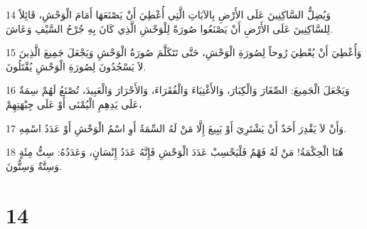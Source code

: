 \par 14 وَيُضِلُّ السَّاكِنِينَ عَلَى الأَرْضِ بِالآيَاتِ الَّتِي أُعْطِيَ أَنْ يَصْنَعَهَا أَمَامَ الْوَحْشِ، قَائِلاً لِلسَّاكِنِينَ عَلَى الأَرْضِ أَنْ يَصْنَعُوا صُورَةً لِلْوَحْشِ الَّذِي كَانَ بِهِ جُرْحُ السَّيْفِ وَعَاشَ.
\par 15 وَأُعْطِيَ أَنْ يُعْطِيَ رُوحاً لِصُورَةِ الْوَحْشِ، حَتَّى تَتَكَلَّمَ صُورَةُ الْوَحْشِ وَيَجْعَلَ جَمِيعَ الَّذِينَ لاَ يَسْجُدُونَ لِصُورَةِ الْوَحْشِ يُقْتَلُونَ.
\par 16 وَيَجْعَلَ الْجَمِيعَ: الصِّغَارَ وَالْكِبَارَ، وَالأَغْنِيَاءَ وَالْفُقَرَاءَ، وَالأَحْرَارَ وَالْعَبِيدَ، تُصْنَعُ لَهُمْ سِمَةٌ عَلَى يَدِهِمِ الْيُمْنَى أَوْ عَلَى جِبْهَتِهِمْ،
\par 17 وَأَنْ لاَ يَقْدِرَ أَحَدٌ أَنْ يَشْتَرِيَ أَوْ يَبِيعَ إِلَّا مَنْ لَهُ السِّمَةُ أَوِ اسْمُ الْوَحْشِ أَوْ عَدَدُ اسْمِهِ.
\par 18 هُنَا الْحِكْمَةُ! مَنْ لَهُ فَهْمٌ فَلْيَحْسِبْ عَدَدَ الْوَحْشِ فَإِنَّهُ عَدَدُ إِنْسَانٍ، وَعَدَدُهُ: سِتُّ مِئَةٍ وَسِتَّةٌ وَسِتُّونَ.

\chapter{14}


